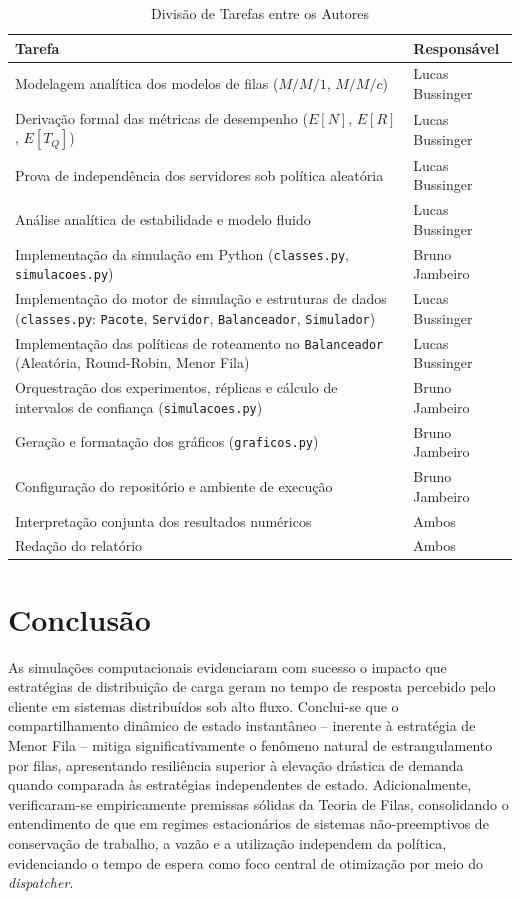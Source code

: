 \documentclass[conference]{IEEE_Conference_Template/IEEEtran}
\begin{document}
\begin{table}[H]
\caption{Divisão de Tarefas entre os Autores}
\label{tab:divisao}
\centering
\begin{tabular}{|p{}|p{}|}
\hline
\textbf{Tarefa} & \textbf{Responsável} \\
\hline
Modelagem analítica dos modelos de filas ($M/M/1$, $M/M/c$) & Lucas Bussinger \\
\hline
Derivação formal das métricas de desempenho ($E[N]$, $E[R]$, $E[T_Q]$) & Lucas Bussinger \\
\hline
Prova de independência dos servidores sob política aleatória & Lucas Bussinger \\
\hline
Análise analítica de estabilidade e modelo fluido & Lucas Bussinger \\
\hline
Implementação da simulação em Python (\texttt{classes.py}, \texttt{simulacoes.py}) & Bruno Jambeiro \\
Implementação do motor de simulação e estruturas de dados (\texttt{classes.py}: \texttt{Pacote}, \texttt{Servidor}, \texttt{Balanceador}, \texttt{Simulador}) & Lucas Bussinger \\
\hline
Implementação das políticas de roteamento no \texttt{Balanceador} (Aleatória, Round-Robin, Menor Fila) & Lucas Bussinger \\
\hline
Orquestração dos experimentos, réplicas e cálculo de intervalos de confiança (\texttt{simulacoes.py}) & Bruno Jambeiro \\
\hline
Geração e formatação dos gráficos (\texttt{graficos.py}) & Bruno Jambeiro \\
\hline
Configuração do repositório e ambiente de execução & Bruno Jambeiro \\
\hline
Interpretação conjunta dos resultados numéricos & Ambos \\
\hline
Redação do relatório & Ambos \\
\hline
\end{tabular}
\end{table}

\section{Conclusão}
As simulações computacionais evidenciaram com sucesso o impacto que estratégias de distribuição de carga geram no tempo de resposta percebido pelo cliente em sistemas distribuídos sob alto fluxo. Conclui-se que o compartilhamento dinâmico de estado instantâneo – inerente à estratégia de Menor Fila – mitiga significativamente o fenômeno natural de estrangulamento por filas, apresentando resiliência superior à elevação drástica de demanda quando comparada às estratégias independentes de estado. Adicionalmente, verificaram-se empiricamente premissas sólidas da Teoria de Filas, consolidando o entendimento de que em regimes estacionários de sistemas não-preemptivos de conservação de trabalho, a vazão e a utilização independem da política, evidenciando o tempo de espera como foco central de otimização por meio do \textit{dispatcher}.
\end{document}

